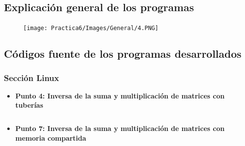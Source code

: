 \documentclass[12pt]{article}
\begin{document}
                   

    \subsection{Explicación general de los programas}
        \begin{figure}[h!]
                \centering
               \texttt{[image: Practica6/Images/General/4.PNG]}
        \end{figure}

    \subsection{Códigos fuente de los programas desarrollados}
    

      \subsubsection{Sección Linux}
      \begin{itemize}
        \item [\Checkmark]\textbf{Punto 4: Inversa de la suma y multiplicación de matrices con tuberías}
          \inputminted{c++}{Code/Linux/4.c}
        \item[\Checkmark] \textbf{Punto 7: Inversa de la suma y multiplicación de matrices con memoria compartida}
          \inputminted{c++}{Code/Linux/7.c}
      \end{itemize}


    
\end{document}
